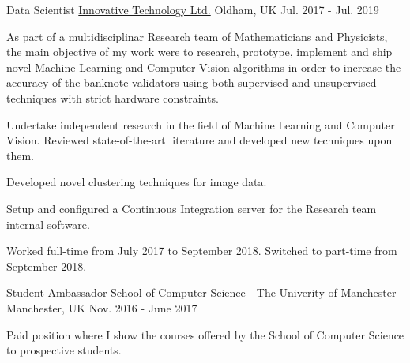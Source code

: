 \begin{cventries}

  \cventry
    {Data Scientist}
    {\href{http://innovative-technology.com/}{Innovative Technology Ltd.}}
    {Oldham, UK}
    {Jul. 2017 - Jul. 2019}
    {
      \begin{cvitems}
        \item {As part of a multidisciplinar Research team of Mathematicians and Physicists, the main objective of my work were to research, prototype, implement and ship novel Machine Learning and Computer Vision algorithms in order to increase the accuracy of the banknote validators using both supervised and unsupervised techniques with strict hardware constraints.}
        \item {Undertake independent research in the field of Machine Learning and Computer Vision. Reviewed state-of-the-art literature and developed new techniques upon them.}
        \item {Developed novel clustering techniques for image data.}
        \item {Setup and configured a Continuous Integration server for the Research team internal software.}
        \item {Worked full-time from July 2017 to September 2018. Switched to part-time from September 2018.}
      \end{cvitems}
    }

  \cventry
    {Student Ambassador}
    {School of Computer Science - The Univerity of Manchester}
    {Manchester, UK}
    {Nov. 2016 - June 2017}
    {
      \begin{cvitems}
        \item {Paid position where I show the courses offered by the School of Computer Science to prospective students.}
      \end{cvitems}
    }


\end{cventries}
